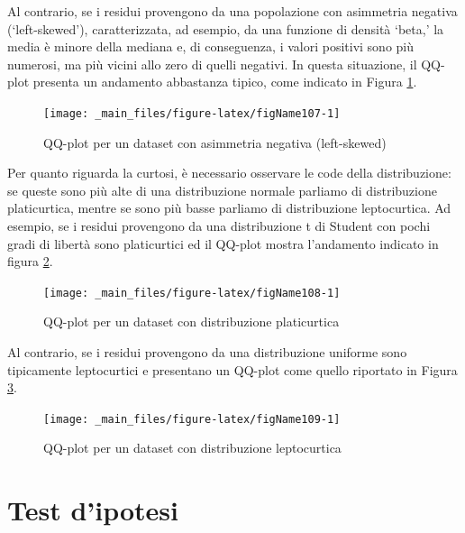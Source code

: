\documentclass[a4paper,12pt,oneside]{book}
\begin{document}
Al contrario, se i residui provengono da una popolazione con asimmetria negativa (`left-skewed'), caratterizzata, ad esempio, da una funzione di densità `beta,' la media è minore della mediana e, di conseguenza, i valori positivi sono più numerosi, ma più vicini allo zero di quelli negativi. In questa situazione, il QQ-plot presenta un andamento abbastanza tipico, come indicato in Figura \ref{fig:figName107}.

\begin{figure}

{\centering \texttt{[image: \_main\_files/figure-latex/figName107-1]} 

}

\caption{QQ-plot per un dataset con asimmetria negativa (left-skewed)}\label{fig:figName107}
\end{figure}

Per quanto riguarda la curtosi, è necessario osservare le code della distribuzione: se queste sono più alte di una distribuzione normale parliamo di distribuzione platicurtica, mentre se sono più basse parliamo di distribuzione leptocurtica. Ad esempio, se i residui provengono da una distribuzione t di Student con pochi gradi di libertà sono platicurtici ed il QQ-plot mostra l'andamento indicato in figura \ref{fig:figName108}.

\begin{figure}

{\centering \texttt{[image: \_main\_files/figure-latex/figName108-1]} 

}

\caption{QQ-plot per un dataset con distribuzione platicurtica}\label{fig:figName108}
\end{figure}

Al contrario, se i residui provengono da una distribuzione uniforme sono tipicamente leptocurtici e presentano un QQ-plot come quello riportato in Figura \ref{fig:figName109}.

\begin{figure}

{\centering \texttt{[image: \_main\_files/figure-latex/figName109-1]} 

}

\caption{QQ-plot per un dataset con distribuzione leptocurtica}\label{fig:figName109}
\end{figure}

\hypertarget{test-dipotesi-1}{%
\section{Test d'ipotesi}\label{test-dipotesi-1}}
\end{document}
